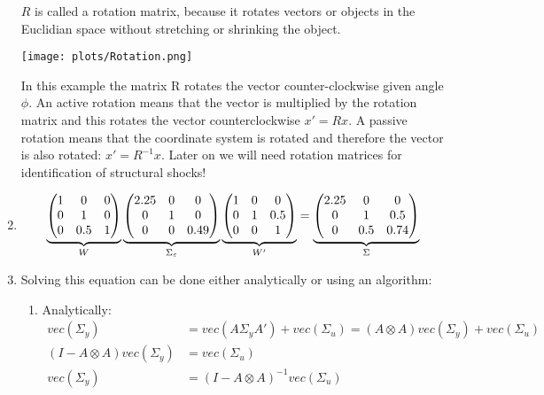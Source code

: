 \begin{enumerate}


\(R\) is called a rotation matrix,
  because it rotates vectors or objects in the Euclidian space without stretching or shrinking the object.
\begin{center}
\texttt{[image: plots/Rotation.png]}
\end{center}
In this example the matrix R rotates the vector counter-clockwise given angle \(\phi \).
An active rotation means that the vector is multiplied by the rotation matrix
  and this rotates the vector counterclockwise \(x' = Rx\).
A passive rotation means that the coordinate system is rotated and therefore the vector is also rotated: \(x' = R^{-1} x\).
Later on we will need rotation matrices for identification of structural shocks!

\item 
\begin{align*}
\underbrace{%
  \begin{pmatrix}
  1 & 0   & 0 \\
  0 & 1   & 0 \\
  0 & 0.5 & 1
  \end{pmatrix}
}_W
\underbrace{%
  \begin{pmatrix}
  2.25 & 0 & 0 \\
  0    & 1 & 0 \\
  0    & 0 & 0.49
  \end{pmatrix}
}_{\Sigma_\varepsilon}
\underbrace{%
  \begin{pmatrix}
  1 & 0 & 0   \\
  0 & 1 & 0.5 \\
  0 & 0 & 1
  \end{pmatrix}
}_{W'}
=
\underbrace{%
  \begin{pmatrix}
  2.25 & 0  &  0   \\
  0    & 1   & 0.5 \\
  0    & 0.5 & 0.74
  \end{pmatrix}
}_{\Sigma}
\end{align*}

\item Solving this equation can be done either analytically or using an algorithm:

\begin{enumerate}

\item Analytically:
\begin{align*}
vec(\Sigma_y) &= vec(A \Sigma_y A') + vec(\Sigma_u) = (A \otimes A)vec(\Sigma_y) + vec(\Sigma_u)
\\
(I-A\otimes A)vec(\Sigma_y) &= vec(\Sigma_u)
\\
vec(\Sigma_y) &= {(I-A\otimes A)}^{-1}vec(\Sigma_u)
\end{align*}


\end{enumerate}
\end{enumerate}
